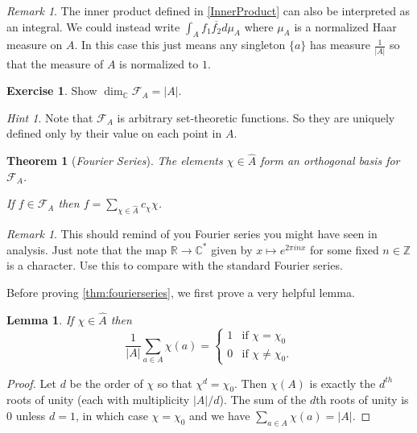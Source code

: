 \documentclass[11pt]{article}
\newcommand{\BB}[1]{\mathbb{#1}} %
\newcommand{\script}[1]{\mathcal{#1}} %
\newcommand{\CC}{\BB{C}}
\newcommand{\RR}{\BB{R}}
\newcommand{\ZZ}{\BB{Z}}
\newcommand{\sF}{\script{F}}
\renewcommand{\hat}{\widehat}
\theoremstyle{plain}
\newtheorem{thm}[theoremcounter]{Theorem}
\newtheorem{lem}[lemmacounter]{Lemma}
\theoremstyle{definition}
\newtheorem{excer}[exercisecounter]{Exercise}
\theoremstyle{remark}
\newtheorem{rem}[remarkcounter]{Remark}
\newtheorem*{hint}{Hint}
\begin{document}
\begin{rem}
	The inner product defined in \autoref{InnerProduct} can also be interpreted as an integral. We could instead write $\int_Af_1\overline{f_2}d\mu_A$ where $\mu_A$ is a normalized Haar measure on $A$. In this case this just means any singleton $\{a\}$ has measure $\frac{1}{|A|}$ so that the measure of $A$ is normalized to $1$.
\end{rem}

\begin{excer}\label{ex:dimsF_A}
	Show $\dim_\CC\sF_A = |A|$.
	\begin{hint}
		Note that $\sF_A$ is arbitrary set-theoretic functions. So they are uniquely defined only by their value on each point in $A$.
	\end{hint}
\end{excer}

\begin{thm}[\emph{Fourier Series}]\label{thm:fourierseries}
	The elements $\chi\in\hat{A}$ form an orthogonal basis for $\sF_A$.

	If $f\in\sF_A$ then $f = \sum\limits_{\chi\in\hat{A}}c_{\chi}\chi$.
\end{thm}

\begin{rem}
	This should remind of you Fourier series you might have seen in analysis. Just note that the map $\RR\to\CC^*$ given by $x\mapsto e^{2\pi i n x}$ for some fixed $n\in\ZZ$ is a character. Use this to compare with the standard Fourier series.
\end{rem}

Before proving \autoref{thm:fourierseries}, we first prove a very helpful lemma.

\begin{lem}\label{lem:ortholemma}
	If $\chi\in\hat{A}$ then
	$$
	\frac{1}{|A|}\sum_{a\in A}\chi(a) =
	\begin{cases}
		1 &\text{if $\chi=\chi_0$}
		\\
		0 &\text{if $\chi\neq\chi_0$.}
	\end{cases}
	$$
\end{lem}
\begin{proof}
	Let $d$ be the order of $\chi$ so that $\chi^d = \chi_0$. Then $\chi(A)$ is exactly the $d^{th}$ roots of unity (each with multiplicity $|A|/d$). The sum of the $d$th roots of unity is $0$ unless $d=1$, in which case $\chi=\chi_0$ and we have $\sum_{a\in A}\chi(a) = |A|$.
\end{proof}
\end{document}
